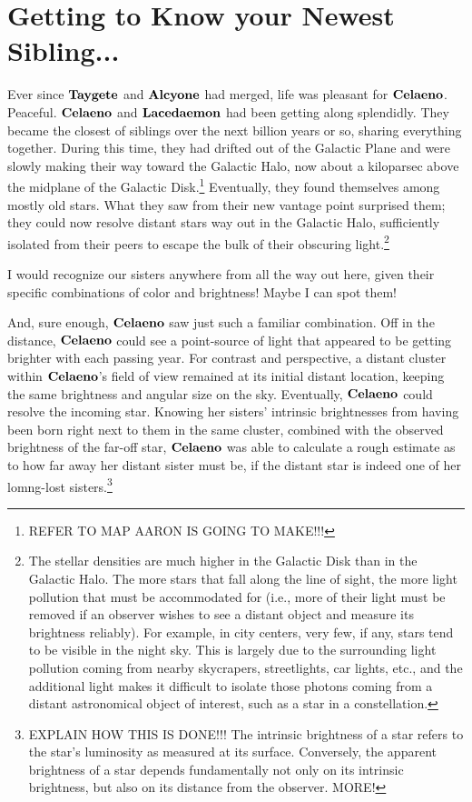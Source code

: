 \documentclass[main.tex]{subfiles}
\begin{document}
\chapter{Getting to Know your Newest Sibling...}

\par \nar Ever since $\Taygete$ and $\Alcyone$ had merged, life was pleasant for $\Celaeno$.  Peaceful.  $\Celaeno$ and $\Lacedaemon$ had been getting along splendidly.  They became the closest of siblings over the next billion years or so, sharing everything together.  During this time, they had drifted out of the Galactic Plane and were slowly making their way toward the Galactic Halo, now about a kiloparsec above the midplane of the Galactic Disk.\footnote{REFER TO MAP AARON IS GOING TO MAKE!!!} 
Eventually, they found themselves among mostly old stars. What they saw from their new vantage point surprised them; they could now resolve distant stars way out in the Galactic Halo, sufficiently isolated from their peers to escape the bulk of their obscuring light.\footnote{The stellar densities are much higher in the Galactic Disk than in the Galactic Halo.  The more stars that fall along the line of sight, the more light pollution that must be accommodated for (i.e., more of their light must be removed if an observer wishes to see a distant object and measure its brightness reliably).  For example, in city centers, very few, if any, stars tend to be visible in the night sky.  This is largely due to the surrounding light pollution coming from nearby skycrapers, streetlights, car lights, etc., and the additional light makes it difficult to isolate those photons coming from a distant astronomical object of interest, such as a star in a constellation.}  

\par \Celaeno I would recognize our sisters anywhere from all the way out here, given their specific combinations of color and brightness!  Maybe I can spot them! 

\par \nar And, sure enough, $\Celaeno$ saw just such a familiar combination.  Off in the distance, $\Celaeno$ could see a point-source of light that appeared to be getting brighter with each passing year.  For contrast and perspective, a distant cluster within $\Celaeno$'s field of view remained at its initial distant location, keeping the same brightness and angular size on the sky.  Eventually, $\Celaeno$ could resolve the incoming star.  Knowing her sisters' intrinsic brightnesses from having been born right next to them in the same cluster, combined with the observed brightness of the far-off star, $\Celaeno$ was able to calculate a rough estimate as to how far away her distant sister must be, if the distant star is indeed one of her lomng-lost sisters.\footnote{EXPLAIN HOW THIS IS DONE!!!  The intrinsic brightness of a star refers to the star's luminosity as measured at its surface.  Conversely, the apparent brightness of a star depends fundamentally not only on its intrinsic brightness, but also on its distance from the observer. MORE!}
\end{document}
